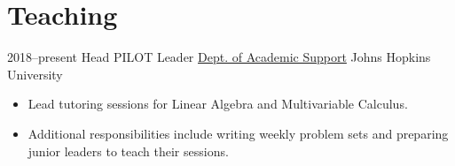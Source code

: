 \section{Teaching}

\cventry
{2018--present}
{Head PILOT Leader}
{\href{https://academicsupport.jhu.edu/pilot/}{Dept. of Academic Support}}
{Johns Hopkins University}
{}
{
\begin{itemize}
    \item Lead tutoring sessions for Linear Algebra and Multivariable Calculus.
    \item Additional responsibilities include writing weekly problem sets and preparing junior leaders to teach their sessions.
\end{itemize}
}